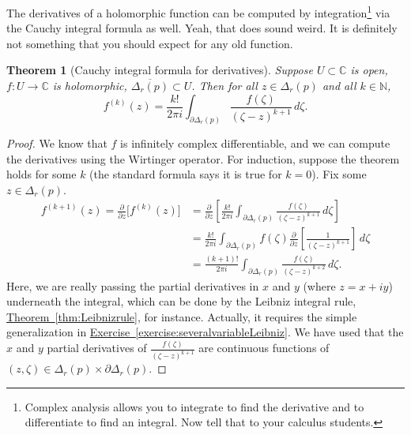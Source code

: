 \documentclass[12pt,openany]{book}
\newcommand{\C}{{\mathbb{C}}}
\newcommand{\N}{{\mathbb{N}}}
\theoremstyle{plain}
\newtheorem{thm}{Theorem}[section]
\theoremstyle{remark}
\theoremstyle{definition}
\theoremstyle{exercise}
\theoremstyle{example}
\newcommand{\exerciseref}[1]{\hyperref[#1]{Exercise~\ref*{#1}}}
\newcommand{\thmref}[1]{\hyperref[#1]{Theorem~\ref*{#1}}}
\begin{document}
The derivatives of a holomorphic function can be computed by
integration\footnote{Complex analysis allows you to integrate to find the
derivative and to differentiate to find an integral.  Now tell that to your
calculus students.} via the Cauchy integral formula as well.
Yeah, that does sound weird.
It is definitely not something that you should expect for any old function.

\begin{thm}[Cauchy integral formula for derivatives]
Suppose $U \subset \C$ is open, $f \colon U \to \C$ is holomorphic,
$\overline{\Delta_r(p)} \subset U$.
Then for all $z \in \Delta_r(p)$ and all $k \in \N$,
\begin{equation*}
f^{(k)}(z)
=
\frac{k!}{2\pi i}
\int_{\partial \Delta_r(p)}
\frac{f(\zeta)}{(\zeta-z)^{k+1}}
\,
d \zeta .
\end{equation*}
\end{thm}

\begin{proof}
We know that $f$ is infinitely complex differentiable, and we can compute
the derivatives using the Wirtinger operator.
For induction, suppose the theorem holds for some $k$
(the standard formula says it is true for $k=0$).  Fix some $z \in
\Delta_r(p)$.
\begin{equation*}
\begin{split}
f^{(k+1)}(z)
=
\frac{\partial }{\partial z}
\bigl[ f^{(k)}(z) \bigr]
& =
\frac{\partial }{\partial z}
\left[
\frac{k!}{2\pi i}
\int_{\partial \Delta_r(p)}
\frac{f(\zeta)}{(\zeta-z)^{k+1}}
\,
d \zeta
\right]
\\
& = 
\frac{k!}{2\pi i}
\int_{\partial \Delta_r(p)}
f(\zeta)
\frac{\partial }{\partial z}
\left[
\frac{1}{(\zeta-z)^{k+1}}
\right]
\,
d \zeta
\\
& = 
\frac{(k+1)!}{2\pi i}
\int_{\partial \Delta_r(p)}
\frac{f(\zeta)}{(\zeta-z)^{k+2}}
\,
d \zeta .
\end{split}
\end{equation*}
Here, we are really passing the partial derivatives in $x$ and $y$ (where $z=x+iy$)
underneath the integral,
which can be done by 
the Leibniz integral rule, \thmref{thm:Leibnizrule}, for instance.
Actually, it requires the simple generalization in
\exerciseref{exercise:severalvariableLeibniz}.
We have used that the
$x$ and $y$ partial derivatives of 
$\frac{f(\zeta)}{(\zeta-z)^{k+1}}$ are continuous
functions of $(z,\zeta) \in \Delta_r(p) \times \partial \Delta_r(p)$.
\end{proof}
\end{document}
